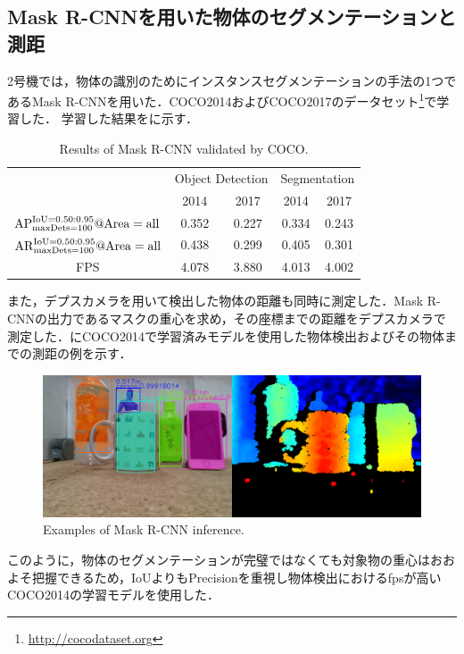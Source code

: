 \subsection{Mask R-CNNを用いた物体のセグメンテーションと測距}\label{sec:mrcnn学習}
2号機では，物体の識別のためにインスタンスセグメンテーションの手法の1つであるMask R-CNNを用いた．COCO2014およびCOCO2017のデータセット\footnote{\url{http://cocodataset.org}}で学習した．
学習した結果をに示す．

\begin{table}[H]
    \centering
    \caption{Results of Mask R-CNN validated by COCO.}
    \begin{tabular}{ccccc}\toprule
        & \multicolumn{2}{c}{Object Detection} & \multicolumn{2}{c}{Segmentation} \\ 
        & 2014 & 2017 & 2014 & 2017 \\ \midrule
        $\rm{AP}^{\rm{IoU}=0.50:0.95} _{\rm maxDets=100} @Area=all$ & 0.352 & 0.227 & 0.334 & 0.243 \\ 
        $\rm{AR}^{\rm{IoU}=0.50:0.95} _{\rm maxDets=100} @Area=all$ & 0.438 & 0.299 & 0.405 & 0.301 \\ 
        FPS & 4.078 & 3.880 & 4.013 & 4.002 \\ \bottomrule
    \end{tabular} 
    \label{tab:MSCOCO評価}
\end{table}

また，デプスカメラを用いて検出した物体の距離も同時に測定した．Mask R-CNNの出力であるマスクの重心を求め，その座標までの距離をデプスカメラで測定した．にCOCO2014で学習済みモデルを使用した物体検出およびその物体までの測距の例を示す．

\begin{figure}[H]
    \centering
    \includegraphics[width=0.7\linewidth]{figure/chapter4/MaskR-CNN_screenshot}
    \caption{Examples of Mask R-CNN inference.}
    \label{fig:maskrcnn例}
\end{figure}

このように，物体のセグメンテーションが完璧ではなくても対象物の重心はおおよそ把握できるため，IoUよりもPrecisionを重視し物体検出におけるfpsが高いCOCO2014の学習モデルを使用した．


